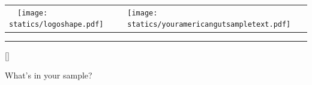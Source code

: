 \documentclass[landscape]{article}
\begin{document}
\begin{tabular}{ m{4.4cm} m{16cm} }  %
	~~\texttt{[image: statics/logoshape.pdf]} & \texttt{[image: statics/youramericangutsampletext.pdf]} \\
\end{tabular}

\hrule

\vspace{0.65cm}


\begin{center}

\StrLen{\yourname}[\yournameLen]


\end{center}

\vspace{0.65cm}


{\huge What's in your \sampletype{} sample?}

\vspace{2mm}
\end{document}
